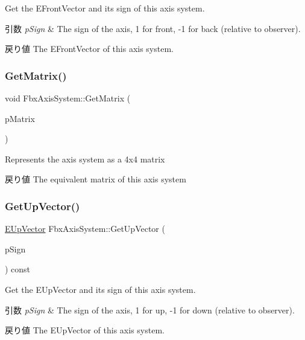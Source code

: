 Get the E\+Front\+Vector and its sign of this axis system. 
\begin{DoxyParams}{引数}
{\em p\+Sign} & The sign of the axis, 1 for front, -\/1 for back (relative to observer). \\
\hline
\end{DoxyParams}
\begin{DoxyReturn}{戻り値}
The E\+Front\+Vector of this axis system. 
\end{DoxyReturn}
\mbox{\label{class_fbx_axis_system_a2ee31cfe8c836f4abdbc939a0891a6a9}} 
\subsubsection{\texorpdfstring{Get\+Matrix()}{GetMatrix()}}
{\footnotesize\ttfamily void Fbx\+Axis\+System\+::\+Get\+Matrix (\begin{DoxyParamCaption}\item[{\hyperlink{class_fbx_a_matrix}{Fbx\+A\+Matrix} \&}]{p\+Matrix }\end{DoxyParamCaption})}

Represents the axis system as a 4x4 matrix \begin{DoxyReturn}{戻り値}
The equivalent matrix of this axis system 
\end{DoxyReturn}
\mbox{\label{class_fbx_axis_system_a3ed72f373b701c5f7c108e93f23e0e73}} 
\subsubsection{\texorpdfstring{Get\+Up\+Vector()}{GetUpVector()}}
{\footnotesize\ttfamily \hyperlink{class_fbx_axis_system_ad41a41f7ccd9167f54d09b65ad781d00}{E\+Up\+Vector} Fbx\+Axis\+System\+::\+Get\+Up\+Vector (\begin{DoxyParamCaption}\item[{int \&}]{p\+Sign }\end{DoxyParamCaption}) const}

Get the E\+Up\+Vector and its sign of this axis system. 
\begin{DoxyParams}{引数}
{\em p\+Sign} & The sign of the axis, 1 for up, -\/1 for down (relative to observer). \\
\hline
\end{DoxyParams}
\begin{DoxyReturn}{戻り値}
The E\+Up\+Vector of this axis system. 
\end{DoxyReturn}
\mbox{\label{class_fbx_axis_system_adf5cf05010b87ddde4bb158e274892b4}} 
